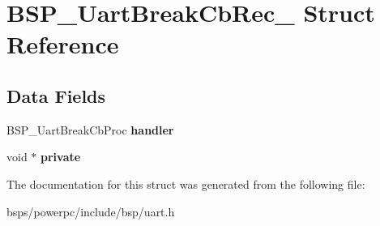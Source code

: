\hypertarget{structBSP__UartBreakCbRec__}{}\section{B\+S\+P\+\_\+\+Uart\+Break\+Cb\+Rec\+\_\+ Struct Reference}
\label{structBSP__UartBreakCbRec__}
\subsection*{Data Fields}
\begin{DoxyCompactItemize}
\item 
\mbox{\label{structBSP__UartBreakCbRec___a79a894eb7f85f524bed85021cd3f6664}} 
B\+S\+P\+\_\+\+Uart\+Break\+Cb\+Proc {\bfseries handler}
\item 
\mbox{\label{structBSP__UartBreakCbRec___afbb79b72e300e404473d60a2c6696a4a}} 
void $\ast$ {\bfseries private}
\end{DoxyCompactItemize}


The documentation for this struct was generated from the following file\+:\begin{DoxyCompactItemize}
\item 
bsps/powerpc/include/bsp/uart.\+h\end{DoxyCompactItemize}
